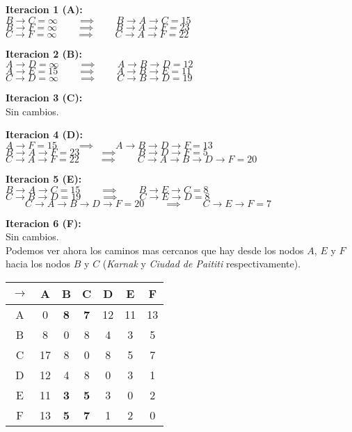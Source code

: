 \documentclass[legalpaper,10pt]{article}
\begin{document}
\begin{enumerate}
\begin{enumerate}
  \textbf{Iteracion 1 (A):}\\
  $B \rightarrow C = \infty \qquad \implies \qquad B \rightarrow A \rightarrow C = 15$\\
  $B \rightarrow F = \infty \qquad \implies \qquad B \rightarrow A \rightarrow F = 23$\\
  $C \rightarrow F = \infty \qquad \implies \qquad C \rightarrow A \rightarrow F = 22$

  \textbf{Iteracion 2 (B):}\\
  $A \rightarrow D = \infty \qquad \implies \qquad A \rightarrow B \rightarrow D = 12$\\
  $A \rightarrow E = 15 \qquad \implies \qquad A \rightarrow B \rightarrow E = 11$\\
  $C \rightarrow D = \infty \qquad \implies \qquad C \rightarrow B \rightarrow D = 19$

  \textbf{Iteracion 3 (C):}\\
  Sin cambios.

  \textbf{Iteracion 4 (D):}\\
  $A \rightarrow F = 15 \qquad \implies \qquad A \rightarrow B \rightarrow D \rightarrow F = 13$\\
  $B \rightarrow A \rightarrow F = 23 \qquad \implies \qquad B \rightarrow D \rightarrow F = 5$\\
  $C \rightarrow A \rightarrow F = 22 \qquad \implies \qquad C \rightarrow A \rightarrow B \rightarrow D \rightarrow F = 20$

  \textbf{Iteracion 5 (E):}\\
  $B \rightarrow A \rightarrow C = 15 \qquad \implies \qquad B \rightarrow E \rightarrow C = 8$\\
  $C \rightarrow B \rightarrow D = 19 \qquad \implies \qquad C \rightarrow E \rightarrow D = 8$\\
  $\qquad C \rightarrow A \rightarrow B \rightarrow D \rightarrow F = 20 \qquad \implies \qquad C \rightarrow E \rightarrow F = 7$

  \textbf{Iteracion 6 (F):}\\
  Sin cambios.\\

  Podemos ver ahora los caminos mas cercanos que hay desde los nodos $A$, $E$ y $F$ hacia los nodos $B$ y $C$ (\textit{Karnak} y \textit{Ciudad de Paititi} respectivamente).

  \begin{center}
    \begin{tabular}{|c|cccccc|}
      \hline
      $\rightarrow$&A&B&C&D&E&F\\
      \hline
      A&0&\textbf{8}&\textbf{7}&12&11&13 \\
      B&8&0&8&4&3&5 \\
      C&17&8&0&8&5&7 \\
      D&12&4&8&0&3&1 \\
      E&11&\textbf{3}&\textbf{5}&3&0&2 \\
      F&13&\textbf{5}&\textbf{7}&1&2&0 \\
      \hline
    \end{tabular}
  \end{center}


\end{enumerate}
\end{enumerate}
\end{document}
